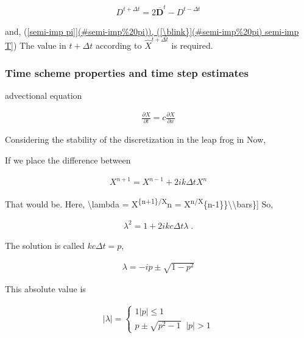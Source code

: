 \begin{eqnarray}
   D^{t+\Delta t} = 2\overline{ \mathbf{D} }^{t} - D^{t-\Delta t}
\end{eqnarray}

and, (\protect\hyperlink{semi-impux5cux2520T}{{[}semi-imp
pi{]}{]}(\#semi-imp\%20pi)),
({[}\textbackslash blink\blink\}{]}(\#semi-imp\%20pi) semi-imp T{]}})
The value in \(t+\Delta t\) according to \(\hat{X}^{t+\Delta t}\) is
required.

\hypertarget{time-scheme-properties-and-time-step-estimates}{%
\subsubsection{Time scheme properties and time step
estimates}\label{time-scheme-properties-and-time-step-estimates}}

advectional equation

\begin{eqnarray}
  \frac{\partial X}{\partial t} = c \frac{\partial X}{\partial x}
\end{eqnarray}

Considering the stability of the discretization in the leap frog in Now,

If we place the difference between

\begin{eqnarray}
  X^{n+1} = X^{n-1} + 2 i k \Delta t X^n
\end{eqnarray}

That would be. Here, \textbackslash lambda =
X\textsuperscript{\{n+1\}/X}n =
X\textsuperscript{n/X}\{n-1\}\}\textbackslash\textbackslash bars\}{]}
So,

\begin{eqnarray}
  \lambda^2 = 1 + 2 i kc \Delta t \lambda \; .
\end{eqnarray}

The solution is called \(kc \Delta t = p\),

\begin{eqnarray}
 \lambda = -i p \pm \sqrt{1-p^2}
\end{eqnarray}

This absolute value is

\begin{eqnarray}
  |\lambda| = \left\{
             \begin{array}{ll}
               1                      |p| \le 1 \\
               p \pm \sqrt{p^2-1} \;\;    |p| > 1
             \end{array}
             \right.
\end{eqnarray}

